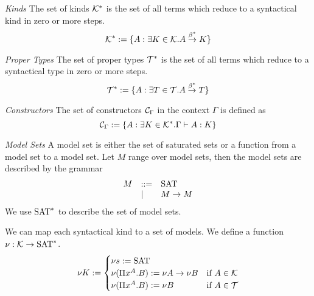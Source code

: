 \begin{definition}
    \emph{Kinds}
    The set of kinds ${\cal K}^*$ is the set of all terms which
    reduce to a syntactical kind in zero or more steps.
    $$
    {\cal K}^* := {\{A: \exists K \in {\cal K}. A \stackrel{\beta^*}{\to} K\}}
    $$
\end{definition}





\begin{definition}
    \emph{Proper Types}
    The set of proper types ${\cal T}^*$ is the set of all
    terms which reduce to a syntactical type in zero or more steps.
    $$
    {\cal T}^* := {\{A: \exists T \in {\cal T}. A \stackrel{\beta^*}{\to} T\}}
    $$
\end{definition}





\begin{definition}
    \emph{Constructors}
    The set of constructors ${\cal C}_\Gamma$ in the
    context $\Gamma$ is defined as
    $$
    {\cal C}_\Gamma := {\{A: \exists K\in{\cal K}^*. \Gamma \vdash A: K\}}
    $$
\end{definition}




\begin{definition}
    \emph{Model Sets} A model set is either the set of saturated sets or a
    function from a model set to a model set. Let $M$ range over model sets,
    then the model sets are described by the grammar
    $$
    \begin{array}{lll}
        M &::=& \text{SAT}
        \\
        &\mid& M \to M
    \end{array}
    $$
    We use $\text{SAT}^*$ to describe the set of model sets.

    We can map each syntactical kind to a set of models. We
    define a function $\nu: \skinds \to \satsets^*$.
    $$
    \nu K :=
    \begin{cases}
        \nu s := \satsets
        
        \\

        \nu (\Pi x^A. B) := \nu A \to \nu B & \mbox{if } A \in \skinds
        
        \\

        \nu (\Pi x^A. B) := \nu B & \mbox{if } A \in \stypes
    \end{cases}
    $$
\end{definition}

